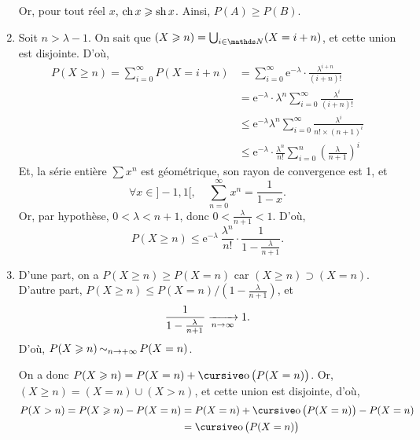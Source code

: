 \documentclass[a4paper]{article}
\begin{document}
\begin{enumerate}
			Or, pour tout réel $x$, $\operatorname{ch} x \geqslant \operatorname{sh} x$. Ainsi, $P(A) \ge P(B)$.
		\item Soit $n > \lambda - 1$.
			On sait que $(X  \ge n) = \bigcup_{i \in \N}(X = i+ n)$, et cette union est disjointe. D'où,
			\begin{align*}
				P(X \ge n) = \sum_{i=0}^\infty P(X = i + n) &= \sum_{i=0}^\infty \mathrm{e}^{-\lambda} \cdot \frac{\lambda^{i+n}}{(i+n)!}\\ &= \mathrm{e}^{-\lambda}\cdot \lambda^n \sum_{i=0}^\infty \frac{\lambda^i}{(i+n)!}\\
				&\le \mathrm{e}^{-\lambda} \lambda^n \sum_{i=0}^\infty \frac{\lambda^i}{n! \times (n+1)^i} \\
				&\le \mathrm{e}^{-\lambda}\cdot \frac{\lambda^n}{n!} \sum_{i=0}^n \left( \frac{\lambda}{n+1} \right)^i
			\end{align*}
			Et, la série entière $\sum x^n$\/ est géométrique, son rayon de convergence est 1, et \[
				\forall x \in {]-1,1[},\quad \sum_{n=0}^\infty x^n = \frac{1}{1-x}
			.\]
			Or, par hypothèse, $0 < \lambda < n + 1$, donc $0 <\frac{\lambda}{n+1} < 1$.
			D'où, \[
				P(X \ge n) \le \mathrm{e}^{-\lambda}\: \frac{\lambda^n}{n!} \cdot \frac{1}{1 - \frac{\lambda}{n+1}}
			.\]
		\item D'une part, on a $P(X \ge n) \ge P(X = n)$\/ car $(X \ge n) \supset (X = n)$. D'autre part, $P(X \ge n) \le P(X = n)/ (1 - \frac{\lambda}{n + 1})$, et \[
				\frac{1}{1-\frac{\lambda}{n+1}} \xrightarrow[n\to \infty]{} 1
			.\] D'où, $P(X \geqslant n) \operatorname*{\sim}_{n\to +\infty} P(X = n)$.

			On a donc $P(X \ge n) = P(X = n) + \po\big(P(X = n)\big)$. Or, $(X \ge n) = (X = n) \cup (X > n)$, et cette union est disjointe, d'où,
			\begin{align*}
				P(X > n) = P(X \ge n) - P(X = n) &= P(X = n) + \po\big(P(X = n)\big) - P(X = n)\\
				&= \po\big(P(X = n)\big)
			\end{align*}
	\end{enumerate}
\end{document}
